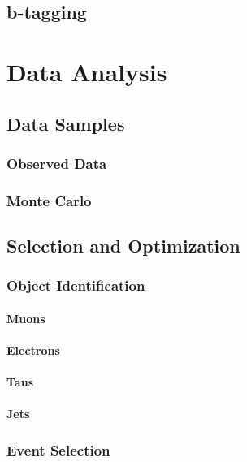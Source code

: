 \documentclass[12pt]{thesis}  %
\begin{document}
\section{b-tagging}
\chapter{Data Analysis
\label{ch:analysis}}

\section{Data Samples}

\subsection{Observed Data}

\subsection{Monte Carlo}

\section{Selection and Optimization}

\subsection{Object Identification}

\subsubsection{Muons}

\subsubsection{Electrons}

\subsubsection{Taus}

\subsubsection{Jets}

\subsection{Event Selection}
\end{document}
